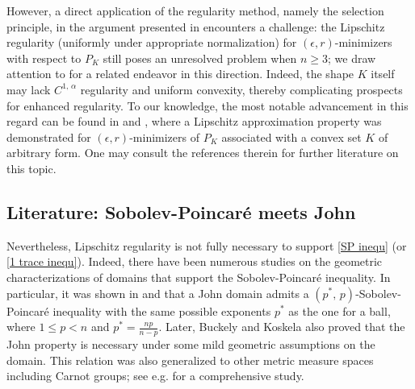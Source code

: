 \documentclass[reqno,11pt]{amsart}
\def\ez{\epsilon}
\numberwithin{equation}{section}
\theoremstyle{remark}
\begin{document}
However, a direct application of the regularity method, namely the selection principle, in the argument presented in \cite{FMP2010} encounters a challenge: the  Lipschitz regularity (uniformly under appropriate normalization) for $(\ez,r)$-minimizers with respect to $P_K$ still poses an unresolved problem when $n\ge 3$; we draw attention to \cite{N2016} for a related endeavor in this direction. Indeed, the shape $K$ itself may lack $C^{1,\,\alpha}$ regularity and uniform convexity, thereby complicating prospects for enhanced regularity.  To our knowledge, the most notable advancement in this regard can be found in \cite{AP1999} and \cite[Proposition 4.6]{ANP2002}, where a Lipschitz approximation property was demonstrated for $(\ez,r)$-minimizers of $P_K$ associated with a convex set $K$ of arbitrary form. One may consult the references therein for further literature on this topic. 


\subsection{Literature: Sobolev-Poincar\'e meets John}
Nevertheless, Lipschitz regularity is not fully necessary to support \eqref{SP inequ} (or \eqref{1 trace inequ}). Indeed, there have been numerous studies on the geometric characterizations of domains that support the Sobolev-Poincar\'e inequality. In particular, it was shown in \cite{B1988} and \cite{GR1983} that a John domain admits a $(p^*,\,p)$-Sobolev-Poincar\'e inequality with the same possible exponents $p^*$ as the one for a ball, where $1\le p<n$ and $p^*=\frac{np}{n-p}$. Later, Buckely and  Koskela \cite{BK1995} also proved that the John property is necessary under some mild geometric assumptions on the domain. 
This relation was also generalized to  other metric measure spaces including Carnot groups; see e.g. \cite{HK2000} for a comprehensive study. 
\end{document}
